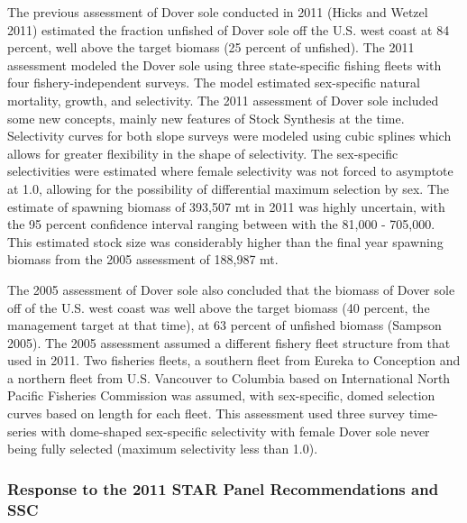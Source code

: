 \documentclass[11pt,
  english,
  a4paper,
]{article}
\begin{document}
The previous assessment of Dover sole conducted in 2011 {(Hicks and Wetzel 2011)\leavevmode\tagmcend\tagstructend} estimated the fraction unfished of Dover sole off the U.S. west coast at 84 percent, well above the target biomass (25 percent of unfished). The 2011 assessment modeled the Dover sole using three state-specific fishing fleets with four fishery-independent surveys. The model estimated sex-specific natural mortality, growth, and selectivity. The 2011 assessment of Dover sole included some new concepts, mainly new features of Stock Synthesis at the time. Selectivity curves for both slope surveys were modeled using cubic splines which allows for greater flexibility in the shape of selectivity. The sex-specific selectivities were estimated where female selectivity was not forced to asymptote at 1.0, allowing for the possibility of differential maximum selection by sex. The estimate of spawning biomass of 393,507 mt in 2011 was highly uncertain, with the 95 percent confidence interval ranging between with the 81,000 - 705,000. This estimated stock size was considerably higher than the final year spawning biomass from the 2005 assessment of 188,987 mt.

\leavevmode\tagmcend\tagstructend\par


The 2005 assessment of Dover sole also concluded that the biomass of Dover sole off of the U.S. west coast was well above the target biomass (40 percent, the management target at that time), at 63 percent of unfished biomass {(Sampson 2005)\leavevmode\tagmcend\tagstructend}. The 2005 assessment assumed a different fishery fleet structure from that used in 2011. Two fisheries fleets, a southern fleet from Eureka to Conception and a northern fleet from U.S. Vancouver to Columbia based on International North Pacific Fisheries Commission was assumed, with sex-specific, domed selection curves based on length for each fleet. This assessment used three survey time-series with dome-shaped sex-specific selectivity with female Dover sole never being fully selected (maximum selectivity less than 1.0).

\leavevmode\tagmcend\tagstructend\par


\hypertarget{response-to-the-2011-star-panel-recommendations-and-ssc}{%
\subsubsection{Response to the 2011 STAR Panel Recommendations and SSC}\label{response-to-the-2011-star-panel-recommendations-and-ssc}}
\end{document}
